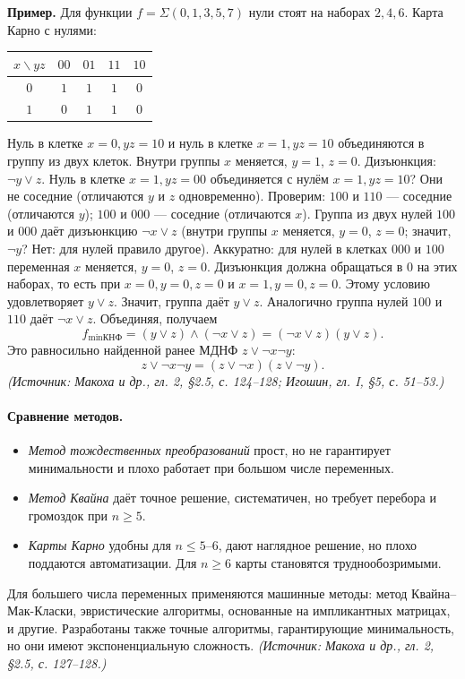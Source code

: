 \documentclass[a4paper,12pt]{article}
\begin{document}
\textbf{Пример.} Для функции \(f=\Sigma(0,1,3,5,7)\) нули стоят на наборах \(2,4,6\). Карта Карно с нулями:
\begin{center}
\begin{tabular}{c|cccc}
\toprule
\(x\backslash yz\) & \(00\) & \(01\) & \(11\) & \(10\) \\
\midrule
\(0\) & \(1\) & \(1\) & \(1\) & \(0\) \\
\(1\) & \(0\) & \(1\) & \(1\) & \(0\) \\
\bottomrule
\end{tabular}
\end{center}
Нуль в клетке \(x=0, yz=10\) и нуль в клетке \(x=1, yz=10\) объединяются в группу из двух клеток. Внутри группы \(x\) меняется, \(y=1\), \(z=0\). Дизъюнкция: \(\neg y\lor z\). Нуль в клетке \(x=1, yz=00\) объединяется с нулём \(x=1, yz=10\)? Они не соседние (отличаются \(y\) и \(z\) одновременно). Проверим: \(100\) и \(110\) — соседние (отличаются \(y\)); \(100\) и \(000\) — соседние (отличаются \(x\)). Группа из двух нулей \(100\) и \(000\) даёт дизъюнкцию \(\neg x\lor z\) (внутри группы \(x\) меняется, \(y=0\), \(z=0\); значит, \(\neg y\)? Нет: для нулей правило другое). Аккуратно: для нулей в клетках \(000\) и \(100\) переменная \(x\) меняется, \(y=0\), \(z=0\). Дизъюнкция должна обращаться в \(0\) на этих наборах, то есть при \(x=0,y=0,z=0\) и \(x=1,y=0,z=0\). Этому условию удовлетворяет \(y\lor z\). Значит, группа даёт \(y\lor z\). Аналогично группа нулей \(100\) и \(110\) даёт \(\neg x\lor z\). Объединяя, получаем
\[
f_{\min\text{КНФ}}=(y\lor z)\land(\neg x\lor z)=(\neg x\lor z)(y\lor z).
\]
Это равносильно найденной ранее МДНФ \(z\lor\neg x\neg y\):
\[
z\lor\neg x\neg y=(z\lor\neg x)(z\lor\neg y).
\]
\textit{(Источник: Макоха и др., гл. 2, §2.5, с. 124--128; Игошин, гл. I, §5, с. 51--53.)}

\paragraph{Сравнение методов.}
\begin{itemize}
\item \emph{Метод тождественных преобразований} прост, но не гарантирует минимальности и плохо работает при большом числе переменных.
\item \emph{Метод Квайна} даёт точное решение, систематичен, но требует перебора и громоздок при \(n\ge 5\).
\item \emph{Карты Карно} удобны для \(n\le 5\)--\(6\), дают наглядное решение, но плохо поддаются автоматизации. Для \(n\ge 6\) карты становятся труднообозримыми.
\end{itemize}
Для большего числа переменных применяются машинные методы: метод Квайна--Мак-Класки, эвристические алгоритмы, основанные на импликантных матрицах, и другие. Разработаны также точные алгоритмы, гарантирующие минимальность, но они имеют экспоненциальную сложность.
\textit{(Источник: Макоха и др., гл. 2, §2.5, с. 127--128.)}
\end{document}
